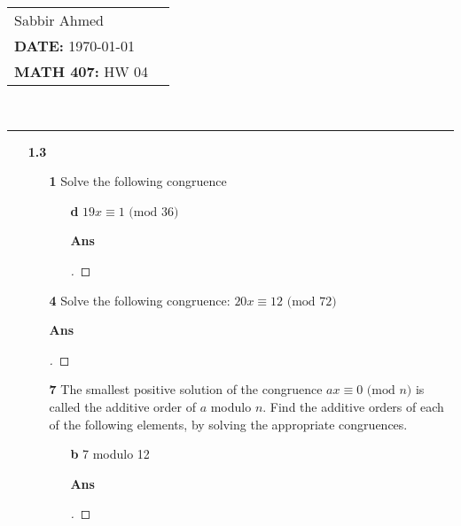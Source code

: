 \documentclass[paper=usletter, fontsize=12pt]{article}
\newcommand{\documentinfo}[5]{
    \begin{centering}
        \parbox{2in}{
        \begin{spacing}{1}
            \begin{flushleft}
                \begin{tabular}{l l}
                    #1 \\
                    #2 \\
                    #3 \\
                \end{tabular}\\
                \rule{\textwidth}{1pt}
            \end{flushleft}
        \end{spacing}
        }
    \end{centering}
}
\begin{document}
    \documentinfo{Sabbir Ahmed}{\textbf{DATE:} \today}{\textbf{MATH 407:} HW 04}
    \vspace{-0.2in}

    \begin{itemize}

        \item[\textbf{1.3}]

        \begin{itemize}

            \item[\textbf{1}] Solve the following congruence

            \begin{itemize}

                \item[\textbf{d}] $19x \equiv 1 \text{ (mod  36)}$
                \item[\textbf{Ans}]
                \begin{proof}[\unskip\nopunct]
                \end{proof}
                \vspace{0.2in}

            \end{itemize}

            \item[\textbf{4}] Solve the following congruence: $20x \equiv 12
            \text{ (mod  72)}$
            \item[\textbf{Ans}]
            \begin{proof}[\unskip\nopunct]
            \end{proof}
            \vspace{0.2in}

            \item[\textbf{7}] The smallest positive solution of the congruence
            $ax \equiv 0 \text{ (mod  $n$)}$ is called the additive order of
            $a$ modulo $n$. Find the additive orders of each of the following
            elements, by solving the appropriate congruences.

            \begin{itemize}

                \item[\textbf{b}] 7 modulo 12
                \item[\textbf{Ans}]
                \begin{proof}[\unskip\nopunct]
                \end{proof}
                \vspace{0.2in}


\end{itemize}
\end{itemize}
\end{itemize}
\end{document}
